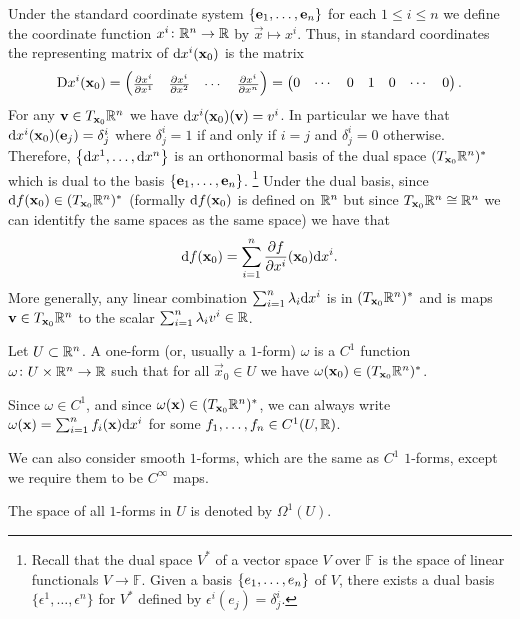 \documentclass[11pt,a4paper]{article}
\begin{document}
Under the standard coordinate system $\left\{\boldsymbol{\mathbf{e}}_1,\dots,\boldsymbol{\mathbf{e}}_n\right\}$
for each $1 \le i \le n$ we define the coordinate function
$x^i \colon \mathbb{R}^n \to \mathbb{R}$ by $\vec x \mapsto x^i$.
Thus, in standard coordinates the representing matrix of $\mathrm{d} x^i(\boldsymbol{\mathbf{x}}_0)$
is the matrix
\[
  \mathrm{D} x^i(\boldsymbol{\mathbf{x}}_0) =
  \begin{pmatrix}
    \frac{\partial x^i}{\partial x^1} &
    \frac{\partial x^i}{\partial x^2} &
    \cdots &
    \frac{\partial x^i}{\partial x^n}
  \end{pmatrix} =
  \begin{pmatrix}
    0 & \cdots & 0 & 1 & 0 & \cdots & 0
  \end{pmatrix}.
\]
For any $\boldsymbol{\mathbf{v}} \in T_{\boldsymbol{\mathbf{x}}_0} \mathbb{R}^n$ we have
$\mathrm{d} x^i(\boldsymbol{\mathbf{x}}_0)(\boldsymbol{\mathbf{v}}) = v^i$.
In particular we have that $\mathrm{d} x^i(\boldsymbol{\mathbf{x}}_0)(\boldsymbol{\mathbf{e}}_j) = \delta^i_j$
where $\delta^i_j = 1$ if and only if $i = j$ and $\delta^i_j = 0$
otherwise.
Therefore, $\set{\dx^1,\dots,\dx^n}$ is an orthonormal
basis of the dual space $(T_{\boldsymbol{\mathbf{x}}_0} \mathbb{R}^n)^*$ which
is dual to the basis $\left\{\boldsymbol{\mathbf{e}}_1,\dots,\boldsymbol{\mathbf{e}}_n\right\}$.
\footnote{Recall that the dual space $V^*$ of a vector space $V$
  over $\mathbb F$ is the space of linear functionals $V \to \mathbb F$.
  Given a basis $\left\{e_1,\dots,e_n\right\}$ of $V$, there exists a dual
  basis $\{\epsilon^1,\dots,\epsilon^n\}$ for $V^*$
  defined by $\epsilon^i(e_j) = \delta^i_j$.}
Under the dual basis, since $\mathrm{d} f(\boldsymbol{\mathbf{x}}_0) \in (T_{\boldsymbol{\mathbf{x}}_0} \mathbb{R}^n)^*$
(formally $\mathrm{d} f(\boldsymbol{\mathbf{x}}_0)$ is defined on $\mathbb{R}^n$
but since $T_{\boldsymbol{\mathbf{x}}_0} \mathbb{R}^n \cong \mathbb{R}^n$ we can identitfy the same
spaces as the same space)
we have that
\[
  \dif f(\vec x_0) =
  \sum_{i=1}^{n} \frac{\partial f}{\partial x^i}(\vec x_0) \dx^i.
\]
More generally, any linear combination $\sum_{i=1}^{n} \lambda_i \dx^i$
is in $(T_{\boldsymbol{\mathbf{x}}_0} \mathbb{R}^n)^*$ and is maps $\boldsymbol{\mathbf{v}} \in T_{\boldsymbol{\mathbf{x}}_0} \mathbb{R}^n$
to the scalar $\sum_{i=1}^{n} \lambda_i v^i \in \mathbb{R}$.

\begin{definition}
  Let $U \subset \mathbb{R}^n$.
  A one-form (or, usually a $1$-form)
  $\omega$ is a $C^1$ function $\omega \colon U \times \mathbb{R}^n \to \mathbb{R}$
  such that for all $\vec x_0 \in U$
  we have $\omega(\boldsymbol{\mathbf{x}}_0) \in (T_{\boldsymbol{\mathbf{x}}_0} \mathbb{R}^n)^*$.
\end{definition}
\begin{remark}
  Since $\omega \in C^1$,
  and since $\omega(\boldsymbol{\mathbf{x}}) \in (T_{\boldsymbol{\mathbf{x}}_0} \mathbb{R}^n)^*$,
  we can always write $\omega(\vec x) = \sum_{i=1}^{n} f_i(\vec x) \dx^i$
  for some $f_1,\dots,f_n \in C^1(U,\mathbb{R})$.
\end{remark}
\begin{remark}
  We can also consider smooth $1$-forms,
  which are the same as $C^1$ $1$-forms,
  except we require them to be $C^{\infty}$ maps.
\end{remark}
\begin{remark}
  The space of all $1$-forms in $U$ is denoted by $\Omega^1(U)$.
\end{remark}
\end{document}
